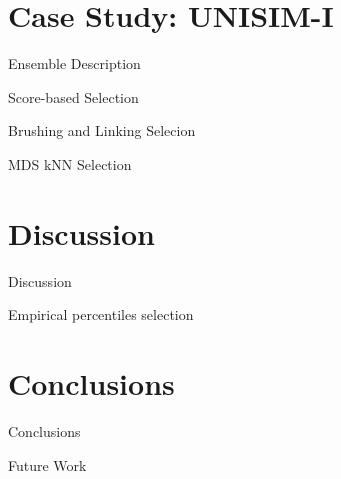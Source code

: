 \documentclass{beamer}
\begin{document}
\begin{frame}
\end{frame}

\section{Case Study: UNISIM-I}
\begin{frame}
  \tableofcontents[currentsection]
\end{frame}

\begin{frame}{Ensemble Description}
\end{frame}

\begin{frame}{Score-based Selection}
\end{frame}

\begin{frame}{Brushing and Linking Selecion}
\end{frame}

\begin{frame}{MDS kNN Selection}
\end{frame}

\section{Discussion}
\begin{frame}
  \tableofcontents[currentsection]
\end{frame}

\begin{frame}{Discussion}
\end{frame}

\begin{frame}{Empirical percentiles selection}
\end{frame}

\section{Conclusions}
\begin{frame}
  \tableofcontents[currentsection]
\end{frame}

\begin{frame}{Conclusions}
\end{frame}

\begin{frame}{Future Work}
\end{frame}

\section{}
\begin{frame}
  \titlepage
\end{frame}
\end{document}

